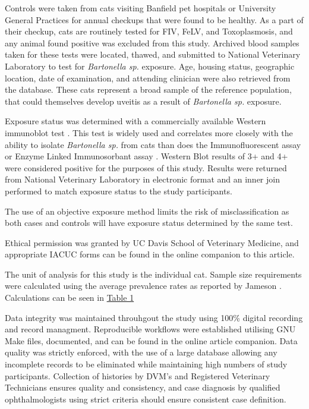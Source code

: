 \documentclass[11pt,twocolumn]{article}
\begin{document}
	Controls were taken from cats visiting Banfield pet hospitals or University General Practices for annual checkups that were found to be healthy. 
	As a part of their checkup, cats are routinely tested for FIV, FeLV, and Toxoplasmosis, and any animal found positive was excluded from this study. 
	Archived blood samples taken for these tests were located, thawed, and submitted to National Veterinary Laboratory to test for \emph{Bartonella sp.} exposure.
	Age, housing status, geographic location, date of examination, and attending clinician  were also retrieved from the database. 
	These cats represent a broad sample of the reference population, that could themselves develop uveitis as a result of \emph{Bartonella sp.} exposure.


	Exposure status was determined with a commercially available Western immunoblot test \cite{febart}. This test is widely used and correlates more closely with the ability to isolate \emph{Bartonella sp.} from cats than does the Immunofluorescent assay or Enzyme Linked Immunosorbant assay \cite{Jr1995}. 
	Western Blot results of 3+ and 4+ were considered positive for the purposes of this study. 
	Results were returned from National Veterinary Laboratory in electronic format and an inner join performed to match exposure status to the study participants.

	The use of an objective exposure method limits the risk of misclassification as both cases and controls will have exposure status determined by the same test.


	Ethical permission was granted by UC Davis School of Veterinary Medicine, and appropriate IACUC forms can be found in the online companion to this article.

	The unit of analysis for this study is the individual cat. 
	Sample size requirements were calculated using the average prevalence rates as reported by Jameson \cite{Jameson1995a}. Calculations can be seen in \hyperref[tab:1]{Table 1}


	Data integrity was maintained throuhgout the study using 100\% digital recording and record managment. 
	Reproducible workflows were established utilising GNU Make files, documented, and can be found in the online article companion.
	Data quality was strictly enforced, with the use of a large database allowing any incomplete records to be eliminated while maintaining high numbers of study participants.
	Collection of histories by DVM's and Registered Veterinary Technicians ensures quality and consistency, and case diagnosis by qualified ophthalmologists using strict criteria should ensure consistent case definition.
\end{document}
